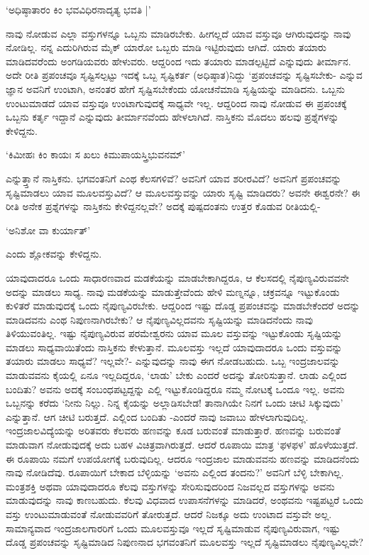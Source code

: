 \begin{shloka}
`ಅಧಿಷ್ಠಾತಾರಂ ಕಿಂ ಭವವಿಧಿರನಾದೃತ್ಯ ಭವತಿ |'
\end{shloka}

ನಾವು ನೋಡುವ ಎಲ್ಲಾ ವಸ್ತುಗಳನ್ನೂ ಒಬ್ಬನು ಮಾಡಿರಬೇಕು. ಹೀಗಲ್ಲದೆ ಯಾವ ವಸ್ತುವೂ ಆಗಿರುವುದನ್ನು ನಾವು ನೋಡಿಲ್ಲ. ನನ್ನ ಎದುರಿಗಿರುವ ಮೈಕ್ ಯಾರೋ ಒಬ್ಬರು ಮಾಡಿ ಇಟ್ಟಿರುವುದು ಆಗಿದೆ. ಯಾರು ತಯಾರು ಮಾಡಿದವರೆಂದು ಅಂಗಡಿಯವರು ಹೇಳುವರು. ಆದ್ದರಿಂದ ಇದು ತಯಾರು ಮಾಡಲ್ಪಟ್ಟಿದೆ ಎನ್ನುವುದು ತೀರ್ಮಾನ. ಅದೇ ರೀತಿ ಪ್ರಪಂಚವೂ ಸೃಷ್ಟಿಸಲ್ಪಟ್ಟು ಇದಕ್ಕೆ ಒಬ್ಬ ಸೃಷ್ಟಿಕರ್ತ (ಅಧಿಷ್ಠಾತ)ನಿದ್ದು `ಪ್ರಪಂಚವನ್ನು ಸೃಷ್ಟಿಸಬೇಕು- ಎನ್ನುವ ಜ್ಞಾನ ಅವನಿಗೆ ಉಂಟಾಗಿ, ಅನಂತರ ಹೇಗೆ ಸೃಷ್ಟಿಸಬೇಕೆಂದು ಯೋಚನೆಮಾಡಿ ಸೃಷ್ಟಿಯನ್ನು ಮಾಡಿದನು. ಒಬ್ಬನು ಉಂಟುಮಾಡದೆ ಯಾವ ವಸ್ತುವೂ ಉಂಟಾಗುವುದಕ್ಕೆ ಸಾಧ್ಯವೇ ಇಲ್ಲ. ಆದ್ದರಿಂದ ನಾವು ನೋಡುವ ಈ ಪ್ರಪಂಚಕ್ಕೆ ಒಬ್ಬನು ಕರ್ತೃ ಇದ್ದಾನೆ ಎನ್ನುವುದು ತೀರ್ಮಾನವೆಂದು ಹೇಳಲಾಗಿದೆ. ನಾಸ್ತಿಕನು ಮೊದಲು ಹಲವು ಪ್ರಶ್ನೆಗಳನ್ನು ಕೇಳಿದ್ದನು.

\begin{shloka}
`ಕಿಮೀಹಃ ಕಿಂ ಕಾಯಃ ಸ ಖಲು ಕಿಮುಪಾಯಸ್ತ್ರಿಭುವನಮ್'
\end{shloka}

ಎನ್ನುತ್ತ್ತಾನೆ ನಾಸ್ತಿಕನು. ಭಗವಂತನಿಗೆ ಎಂಥ ಕೆಲಸಗಳಿವೆ? ಅವನಿಗೆ ಯಾವ ಶರೀರವಿದೆ? ಅವನಿಗೆ ಪ್ರಪಂಚವನ್ನು ಸೃಷ್ಟಿಮಾಡಲು ಯಾವ ಮೂಲವಸ್ತುವಿದೆ? ಆ ಮೂಲವಸ್ತುವನ್ನು ಯಾರು ಸೃಷ್ಟಿ ಮಾಡಿದರು? ಅವನೇ ಈಶ್ವರನೇ? ಈ ರೀತಿ ಅನೇಕ ಪ್ರಶ್ನೆಗಳನ್ನು ನಾಸ್ತಿಕನು ಕೇಳಿದ್ದನಲ್ಲವೇ? ಅದಕ್ಕೆ ಪುಷ್ಪದಂತನು ಉತ್ತರ ಕೊಡುವ ರೀತಿಯಲ್ಲಿ-

\begin{shloka}
`ಅನಿಶೋ ವಾ ಕುರ್ಯಾತ್'
\end{shloka}

ಎಂದು ಶ್ಲೋಕವನ್ನು ಕೇಳಿದ್ದನು.

ಯಾವುದಾದರೂ ಒಂದು ಸಾಧಾರಣವಾದ ಮಡಕೆಯನ್ನು ಮಾಡಬೇಕಾಗಿದ್ದರೂ, ಆ ಕೆಲಸದಲ್ಲಿ ನೈಪುಣ್ಯವಿರುವವನೇ ಅದನ್ನು ಮಾಡಲು ಸಾಧ್ಯ. ನಾವು ಮಡಕೆಯನ್ನು ಮಾಡುತ್ತೇವೆಂದು ಹೇಳಿ ಮಣ್ನನ್ನೂ, ಚಕ್ರವನ್ನೂ ಇಟ್ಟುಕೊಂಡು ಕುಳಿತರೆ ಮಾಡುವುದಕ್ಕೆ ಒಂದು ನೈಪುಣ್ಯವಿರಬೇಕು. ಆದ್ದರಿಂದ ಇಷ್ಟು ದೊಡ್ಡ ಪ್ರಪಂಚವನ್ನು ಮಾಡಬೇಕೆಂದರೆ ಅದನ್ನು ಮಾಡಿದವನು ಎಂಥ ನಿಪುಣನಾಗಿರಬೇಕು? ಆ ನೈಪುಣ್ಯವಿಲ್ಲದವನು ಸೃಷ್ಟಿಯನ್ನು ಮಾಡಿದನೆಂದು ನಾವು ತಿಳಿಯುವಂತಿಲ್ಲ. ಇಷ್ಟು ನೈಪುಣ್ಯವಿರುವ ಪರಮೇಶ್ವರನು ಯಾವ ಮೂಲ ವಸ್ತುವನ್ನು ಇಟ್ಟುಕೊಂಡು ಸೃಷ್ಟಿಯನ್ನು ಮಾಡಲು ಸಾಧ್ಯವಾಯಿತೆಂದು ನಾಸ್ತಿಕನು ಕೇಳುತ್ತಾನೆ. ಮೂಲವಸ್ತು ಇಲ್ಲದೆ ಯಾವುದಾದರೂ ಒಂದು ವಸ್ತುವನ್ನು ತಯಾರು ಮಾಡಲು ಸಾಧ್ಯವೆ? ಇಲ್ಲವೇ?- ಎನ್ನುವುದನ್ನು ನಾವು ಈಗ ನೋಡಬಹುದು. ಒಬ್ಬ ಇಂದ್ರಜಾಲವನ್ನು ಮಾಡುವವನು ಕೈಯಲ್ಲಿ ಏನೂ ಇಲ್ಲದಿದ್ದರೂ, `ಲಾಡು' ಬೇಕು ಎಂದರೆ ಅದನ್ನು ತೋರಿಸುತ್ತಾನೆ. ಲಾಡು ಎಲ್ಲಿಂದ ಬಂದಿತು? ಅವನು ಅದಕ್ಕೆ ಸಂಬಂಧಪಟ್ಟದ್ದನ್ನು ಎಲ್ಲಿ ಇಟ್ಟುಕೊಂಡಿದ್ದರೂ ನಮ್ಮ ನೋಟಕ್ಕೆ ಒಂದೂ ಇಲ್ಲ. ಅವನು ಒಬ್ಬನನ್ನು ಕರೆದು `ನೀನು ನಿಲ್ಲು. ನಿನ್ನ ಕೈಯನ್ನು ಅಲ್ಲಾಡಿಸಬೇಡ! ತಾನಾಗಿಯೇ ನಿನಗೆ ಒಂದು ಚೀಟಿ ಸಿಕ್ಕುವುದು' ಎನ್ನುತ್ತಾನೆ. ಆಗ ಚೀಟಿ ಬರುತ್ತದೆ. ಎಲ್ಲಿಂದ ಬಂದಿತು -ಎಂದರೆ ನಾವು ಜವಾಬು ಹೇಳಲಾಗುವುದಿಲ್ಲ. ಇಂದ್ರಜಾಲವಿದ್ಯೆಯನ್ನು ಅರಿತವರು ಕೆಲವರು ಹಣವನ್ನು ಕೂಡ ಬರುವಂತೆ ಮಾಡುತ್ತಾರೆ. ಹಣವನ್ನು ಬರುವಂತೆ ಮಾಡುವಾಗ ನೋಡುವುದಕ್ಕೆ ಅದು ಬಹಳ ವಿಚಿತ್ರವಾಗಿರುತ್ತದೆ. ಆದರೆ ರೂಪಾಯಿ ಮಾತ್ರ `ಫಳಫಳ' ಹೊಳೆಯುತ್ತದೆ. ಈ ರೂಪಾಯಿ ನಮಗೆ ಉಪಯೋಗಕ್ಕೆ ಬರುವುದಿಲ್ಲ. ಆದರೂ ಇಂದ್ರಜಾಲ ಮಾಡುವವನು ಹಣವನ್ನು ಮಾಡಿದನೆಂದು ನಾವು ನೋಡಿದೆವು. ರೂಪಾಯಿಗೆ ಬೇಕಾದ ಬೆಳ್ಳಿಯನ್ನು `ಅವನು ಎಲ್ಲಿಂದ ತಂದನು?' ಅವನಿಗೆ ಬೆಳ್ಳಿ ಬೇಕಾಗಿಲ್ಲ. ಮಂತ್ರಶಕ್ತಿ ಅಥವಾ ಯಾವುದಾದರೂ ಕೆಲವು ವಸ್ತುಗಳನ್ನು ಸೇರಿಸುವುದರಿಂದ ನಿಜವಲ್ಲದ ವಸ್ತುಗಳನ್ನು ಅವನು ಮಾಡುವುದನ್ನು ನಾವು ಕಾಣಬಹುದು. ಕೆಲವು ವಿಧವಾದ ಉಪಾಸನೆಗಳನ್ನು ಮಾಡಿದರೆ, ಅಂಥವನು ಇಷ್ಟಪಟ್ಟರೆ ಒಂದು ವಸ್ತು ಉಂಟುಮಾಡುವಂತೆ ನೋಡುವವರಿಗೆ ತೋರುತ್ತದೆ. ಆದರೆ ನಿಜಕ್ಕೂ ಅದು ಉಂಟಾದ ವಸ್ತುವೇ ಅಲ್ಲ. ಸಾಮಾನ್ಯವಾದ ಇಂದ್ರಜಾಲಗಾರರಿಗೆ ಒಂದು ಮೂಲವಸ್ತುವೂ ಇಲ್ಲದೆ ಸೃಷ್ಟಿಮಾಡುವ ನೈಪುಣ್ಯವಿರುವಾಗ, ಇಷ್ಟು ದೊಡ್ಡ ಪ್ರಪಂಚವನ್ನು ಸೃಷ್ಟಿಮಾಡಿದ ನಿಪುಣನಾದ ಭಗವಂತನಿಗೆ ಮೂಲವಸ್ತು ಇಲ್ಲದೆ ಸೃಷ್ಟಿಮಾಡಲು ನೈಪುಣ್ಯವಿಲ್ಲವೇ?


